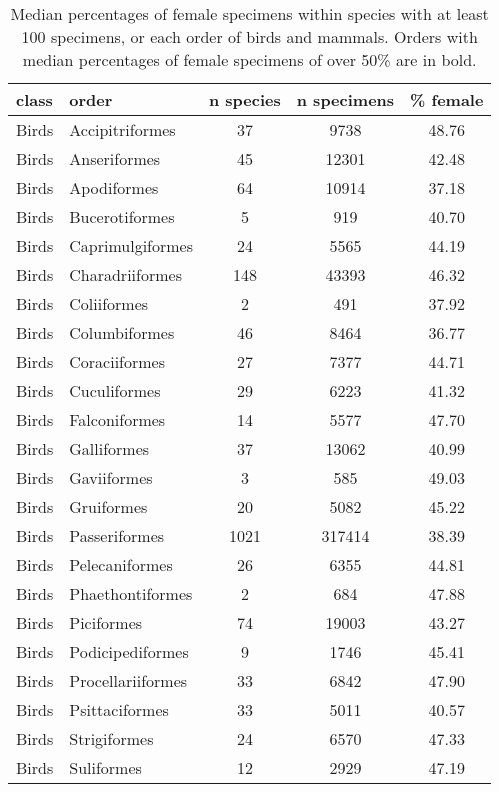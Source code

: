 \begin{longtable}{llccc}
\caption{Median percentages of female specimens within species with at least 
                   100 specimens, or each order of birds and mammals. 
                   Orders with median percentages of female specimens of over 50\% are in bold.} \\ 
  \hline
\textbf{class} & \textbf{order} & \textbf{n species} & \textbf{n specimens} & \textbf{\% female} \\ 
  \hline
Birds & Accipitriformes &  37 & 9738 & 48.76 \\ 
  Birds & Anseriformes &  45 & 12301 & 42.48 \\ 
  Birds & Apodiformes &  64 & 10914 & 37.18 \\ 
  Birds & Bucerotiformes &   5 & 919 & 40.70 \\ 
  Birds & Caprimulgiformes &  24 & 5565 & 44.19 \\ 
  Birds & Charadriiformes & 148 & 43393 & 46.32 \\ 
  Birds & Coliiformes &   2 & 491 & 37.92 \\ 
  Birds & Columbiformes &  46 & 8464 & 36.77 \\ 
  Birds & Coraciiformes &  27 & 7377 & 44.71 \\ 
  Birds & Cuculiformes &  29 & 6223 & 41.32 \\ 
  Birds & Falconiformes &  14 & 5577 & 47.70 \\ 
  Birds & Galliformes &  37 & 13062 & 40.99 \\ 
  Birds & Gaviiformes &   3 & 585 & 49.03 \\ 
  Birds & Gruiformes &  20 & 5082 & 45.22 \\ 
  Birds & Passeriformes & 1021 & 317414 & 38.39 \\ 
  Birds & Pelecaniformes &  26 & 6355 & 44.81 \\ 
  Birds & Phaethontiformes &   2 & 684 & 47.88 \\ 
  Birds & Piciformes &  74 & 19003 & 43.27 \\ 
  Birds & Podicipediformes &   9 & 1746 & 45.41 \\ 
  Birds & Procellariiformes &  33 & 6842 & 47.90 \\ 
  Birds & Psittaciformes &  33 & 5011 & 40.57 \\ 
  Birds & Strigiformes &  24 & 6570 & 47.33 \\ 
  Birds & Suliformes &  12 & 2929 & 47.19 \\ 

\end{longtable}
